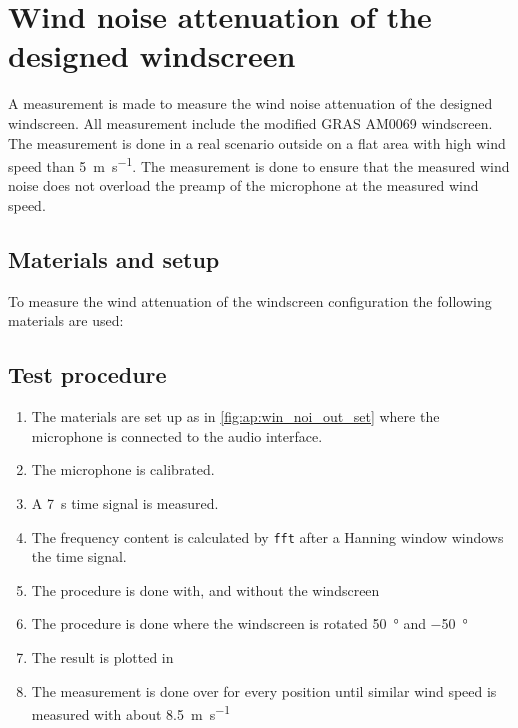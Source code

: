\chapter{Wind noise attenuation of the designed windscreen}\label{ap:wind_noise_in_design}
A measurement is made to measure the wind noise attenuation of the designed windscreen. All measurement include the modified GRAS AM0069 windscreen. The measurement is done in a real scenario outside on a flat area with high wind speed than \SI{5}{\meter\per\second}. The measurement is done to ensure that the measured wind noise does not overload the preamp of the microphone at the measured wind speed.  


\section*{Materials and setup}
To measure the wind attenuation of the windscreen configuration the following materials are used:

\startequipment
{}
\stopequipment
\startequipment
\stopequipment



\section*{Test procedure}


\begin{enumerate}
\item The materials are set up as in \autoref{fig:ap:win_noi_out_set} where the microphone is connected to the audio interface.
\item The microphone is calibrated.
\item A \SI{7}{\second} time signal is measured.
\item The frequency content is calculated by \texttt{fft} after a Hanning window windows the time signal.
\item The procedure is done with, and without the windscreen
\item The procedure is done where the windscreen is rotated \SI{50}{\degree} and \SI{-50}{\degree}
\item The result is plotted in \matlab
\item The measurement is done over for every position until similar wind speed is measured with about \SI{8.5}{\meter\per\second}
\end{enumerate}

